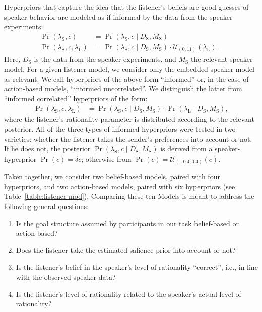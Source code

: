 Hyperpriors that capture the idea that the listener's beliefs are good
guesses of speaker behavior are modeled as if informed by the data
from the speaker experiments:
\begin{align*}
  \Pr(\lambda_\mathrm{S},c) & = \Pr(\lambda_\mathrm{S},c \mid D_\mathrm{S}, M_\mathrm{S}) \\
  \Pr(\lambda_\mathrm{S},c,\lambda_\mathrm{L}) & = 
   \Pr(\lambda_\mathrm{S},c \mid D_\mathrm{S}, M_\mathrm{S}) \cdot  \mathcal{U}_{(0,11)}(
    \lambda_\mathrm{L}) \enspace .
\end{align*}
Here, $D_\mathrm{S}$ is the data from the speaker experiments, and
$M_\mathrm{S}$ the relevant speaker model. For a given listener model,
we consider only the embedded speaker model as relevant. We call
hyperpriors of the above form ``informed'' or, in the case of
action-based models, ``informed uncorrelated''. We distinguish the
latter from ``informed correlated'' hyperpriors of the form:
\begin{align*}
  \Pr(\lambda_\mathrm{S},c,\lambda_\mathrm{L}) & = 
   \Pr(\lambda_\mathrm{S},c \mid D_\mathrm{S}, M_\mathrm{S}) \cdot \Pr(\lambda_\mathrm{L} \mid D_\mathrm{S}, M_\mathrm{S}),
\end{align*}
where the listener's rationality parameter is distributed according to
the relevant posterior. All of the three types of informed hyperpriors
were tested in two varieties: whether the listener takes the sender's
preferences into account or not. If he does not, the posterior
$\Pr(\lambda_\mathrm{S},c \mid D_\mathrm{S}, M_\mathrm{S})$ is derived
from a speaker-hyperprior $\Pr(c) = \delta{c}$; otherwise from $\Pr(c)
= \mathcal{U}_{(-0.4,0.4)}(c)$.

Taken together, we consider two belief-based models, paired with four
hyperpriors, and two action-based models, paired with six hyperpriors
(see Table~\ref{table:listener mod}). Comparing these ten Models is
meant to address the following general questions:
\begin{enumerate}
\item Is the goal structure assumed by participants in our task
  belief-based or action-based?
\item Does the listener take the estimated salience prior into account
  or not?
\item Is the listener's belief in the speaker's level of rationality
  ``correct'', i.e., in line with the observed speaker data?
\item Is the listener's level of rationality related to the speaker's
  actual level of rationality?
\end{enumerate}

